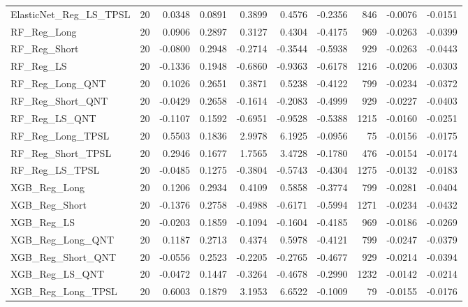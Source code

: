 \begin{tabular}{llrrrrrrrr}
\cline{1-10}
ElasticNet\_Reg\_LS\_TPSL & 20 & 0.0348 & 0.0891 & 0.3899 & 0.4576 & -0.2356 & 846 & -0.0076 & -0.0151 \\
\cline{1-10}
RF\_Reg\_Long & 20 & 0.0906 & 0.2897 & 0.3127 & 0.4304 & -0.4175 & 969 & -0.0263 & -0.0399 \\
\cline{1-10}
RF\_Reg\_Short & 20 & -0.0800 & 0.2948 & -0.2714 & -0.3544 & -0.5938 & 929 & -0.0263 & -0.0443 \\
\cline{1-10}
RF\_Reg\_LS & 20 & -0.1336 & 0.1948 & -0.6860 & -0.9363 & -0.6178 & 1216 & -0.0206 & -0.0303 \\
\cline{1-10}
RF\_Reg\_Long\_QNT & 20 & 0.1026 & 0.2651 & 0.3871 & 0.5238 & -0.4122 & 799 & -0.0234 & -0.0372 \\
\cline{1-10}
RF\_Reg\_Short\_QNT & 20 & -0.0429 & 0.2658 & -0.1614 & -0.2083 & -0.4999 & 929 & -0.0227 & -0.0403 \\
\cline{1-10}
RF\_Reg\_LS\_QNT & 20 & -0.1107 & 0.1592 & -0.6951 & -0.9528 & -0.5388 & 1215 & -0.0160 & -0.0251 \\
\cline{1-10}
RF\_Reg\_Long\_TPSL & 20 & 0.5503 & 0.1836 & 2.9978 & 6.1925 & -0.0956 & 75 & -0.0156 & -0.0175 \\
\cline{1-10}
RF\_Reg\_Short\_TPSL & 20 & 0.2946 & 0.1677 & 1.7565 & 3.4728 & -0.1780 & 476 & -0.0154 & -0.0174 \\
\cline{1-10}
RF\_Reg\_LS\_TPSL & 20 & -0.0485 & 0.1275 & -0.3804 & -0.5743 & -0.4304 & 1275 & -0.0132 & -0.0183 \\
\cline{1-10}
XGB\_Reg\_Long & 20 & 0.1206 & 0.2934 & 0.4109 & 0.5858 & -0.3774 & 799 & -0.0281 & -0.0404 \\
\cline{1-10}
XGB\_Reg\_Short & 20 & -0.1376 & 0.2758 & -0.4988 & -0.6171 & -0.5994 & 1271 & -0.0234 & -0.0432 \\
\cline{1-10}
XGB\_Reg\_LS & 20 & -0.0203 & 0.1859 & -0.1094 & -0.1604 & -0.4185 & 969 & -0.0186 & -0.0269 \\
\cline{1-10}
XGB\_Reg\_Long\_QNT & 20 & 0.1187 & 0.2713 & 0.4374 & 0.5978 & -0.4121 & 799 & -0.0247 & -0.0379 \\
\cline{1-10}
XGB\_Reg\_Short\_QNT & 20 & -0.0556 & 0.2523 & -0.2205 & -0.2765 & -0.4677 & 929 & -0.0214 & -0.0394 \\
\cline{1-10}
XGB\_Reg\_LS\_QNT & 20 & -0.0472 & 0.1447 & -0.3264 & -0.4678 & -0.2990 & 1232 & -0.0142 & -0.0214 \\
\cline{1-10}
XGB\_Reg\_Long\_TPSL & 20 & 0.6003 & 0.1879 & 3.1953 & 6.6522 & -0.1009 & 79 & -0.0155 & -0.0176 \\
\cline{1-10}

\end{tabular}
